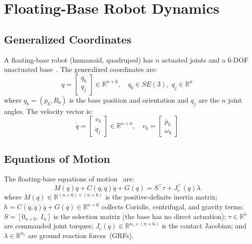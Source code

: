 \section{Floating-Base Robot Dynamics}\label{sec:dynamics}

\subsection{Generalized Coordinates}

A floating-base robot (humanoid, quadruped) has $n$ actuated joints and a
6-DOF unactuated base~\cite{righetti2011inverse}. The generalized
coordinates are:
\begin{equation}\label{eq:gencoord}
  q = \begin{bmatrix} q_b \\ q_j \end{bmatrix} \in \mathbb{R}^{n+6},
  \quad q_b \in SE(3),\; q_j \in \mathbb{R}^n
\end{equation}
where $q_b=(p_b,R_b)$ is the base position and orientation and $q_j$ are
the $n$ joint angles. The velocity vector is:
\begin{equation}\label{eq:vel}
  \dot{q} = \begin{bmatrix} v_b \\ \dot{q}_j \end{bmatrix} \in \mathbb{R}^{n+6},
  \quad v_b = \begin{bmatrix} \dot{p}_b \\ \omega_b \end{bmatrix}
\end{equation}

\subsection{Equations of Motion}

The floating-base equations of motion~\cite{righetti2011inverse} are:
\begin{equation}\label{eq:eom}
  M(q)\ddot{q} + C(q,\dot{q})\dot{q} + G(q) = S^\top\tau + J_c^\top(q)\lambda
\end{equation}
where $M(q)\in\mathbb{R}^{(n+6)\times(n+6)}$ is the positive-definite
inertia matrix; $h=C(q,\dot{q})\dot{q}+G(q)\in\mathbb{R}^{n+6}$ collects
Coriolis, centrifugal, and gravity terms; $S=[0_{n\times6},\,I_n]$ is the
selection matrix (the base has no direct actuation); $\tau\in\mathbb{R}^n$
are commanded joint torques; $J_c(q)\in\mathbb{R}^{n_c\times(n+6)}$ is the
contact Jacobian; and $\lambda\in\mathbb{R}^{n_c}$ are ground reaction
forces~(GRFs).

